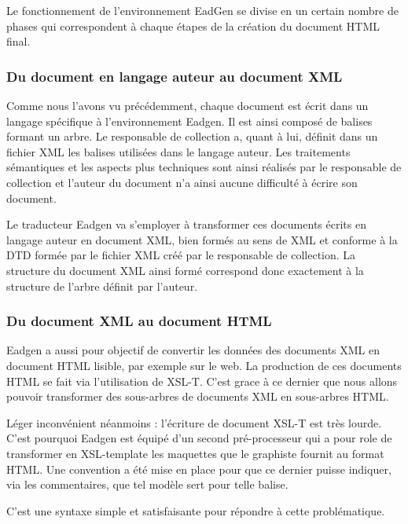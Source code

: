 Le fonctionnement de l'environnement EadGen se divise en un certain
nombre de phases qui correspondent à chaque étapes de la création 
du document HTML final. 

\subsubsection{Du document en langage auteur au document XML}

Comme nous l'avons vu précédemment, chaque document est écrit dans
un langage spécifique à l'environnement Eadgen. Il est ainsi 
composé de balises formant un arbre. Le responsable de collection 
a, quant à lui, définit dans un fichier XML les balises utilisées
dans le langage auteur. Les traitements sémantiques et les aspects 
plus techniques sont ainsi réalisés par le responsable de collection 
et l'auteur du document n'a ainsi aucune difficulté à écrire son 
document. 

Le traducteur Eadgen va s'employer à transformer ces documents 
écrits en langage auteur en document XML, bien formés au sens de
XML et conforme à la DTD formée par le fichier XML créé par le responsable
de collection. La structure du document XML ainsi formé correspond
donc exactement à la structure de l'arbre définit par l'auteur. 

\subsubsection{Du document XML au document HTML}

Eadgen a aussi pour objectif de convertir les données des documents
XML en document HTML lisible, par exemple sur le web. La production de
ces documents HTML se fait via l'utilisation de XSL-T. C'est grace à 
ce dernier que nous allons pouvoir transformer des sous-arbres de documents
XML en sous-arbres HTML. 

Léger inconvénient néanmoins : l'écriture de document XSL-T est très lourde.
C'est pourquoi Eadgen est équipé d'un second pré-processeur qui a pour role
de transformer en XSL-template les maquettes que le graphiste fournit au 
format HTML. Une convention a été mise en place pour que ce dernier puisse
indiquer, via les commentaires, que tel modèle sert pour telle balise. 

C'est une syntaxe simple et satisfaisante pour répondre à cette problématique. 